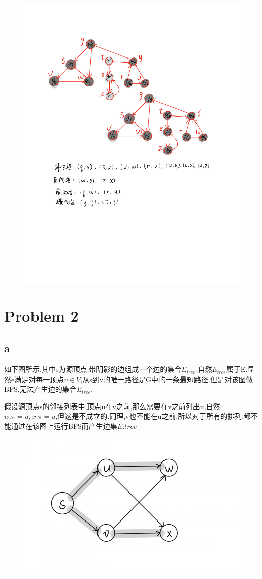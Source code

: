 \documentclass[12pt,a4paper,fontset=none]{ctexart}
\begin{document}
\begin{figure}[H]
    \centering
    \includegraphics[width=1\linewidth]{IMG_0124.PNG}
\end{figure}
\section{Problem 2}
\subsection{a}
如下图所示,其中s为源顶点,带阴影的边组成一个边的集合$E_{tree}$,自然$E_{tree}$属于E.显然e满足对每一顶点$v\in V$,从s到v的唯一路径是G中的一条最短路径.但是对该图做BFS,无法产生边的集合$E_{tree}$.

假设源顶点s的邻接列表中,顶点u在v之前,那么需要在v之前列出u,自然$w.\pi=u,x.\pi=u$,但这是不成立的.同理,v也不能在u之前,所以对于所有的排列,都不能通过在该图上运行BFS而产生边集$E.{tree}$
\begin{figure}[H]
    \centering
    \includegraphics[width=0.7\linewidth]{习题1.png}
\end{figure}
\end{document}
